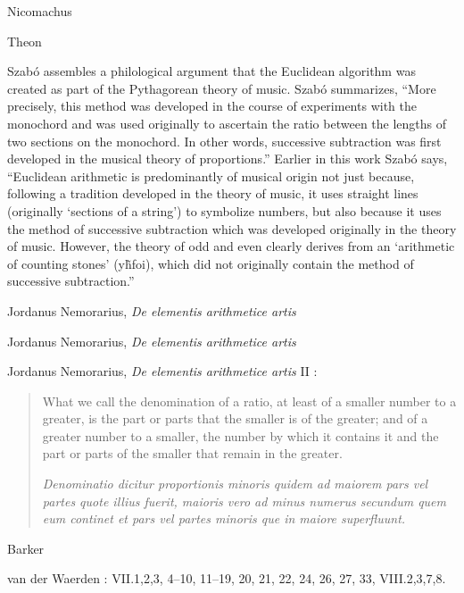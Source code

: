 \documentclass{article}
\begin{document}
Nicomachus \cite{nicomachus}

Theon \cite{theon}

Szab\'o \cite{szabo} assembles a philological argument that the Euclidean algorithm was created
as part of the Pythagorean theory of music. Szab\'o \cite[p.~136, Chapter 2.8]{szabo} summarizes, ``More precisely, 
this method was developed in the course of experiments with the monochord and was used originally to ascertain the ratio
between the lengths of two sections on the monochord. In other words, successive subtraction was first developed in the musical
theory of proportions.'' Earlier in this work Szab\'o \cite[pp.~28--29]{szabo} says, ``Euclidean arithmetic is predominantly of musical origin
not just because, following a tradition developed in the theory of music, it uses straight lines (originally `sections of a string') to symbolize numbers, but also because
it uses the method of successive subtraction which was developed originally in the theory of music. However, the theory of odd and even clearly derives from
an `arithmetic of counting stones' (\textgreek{y\~hfoi}), which did not originally contain the method of successive subtraction.''



Jordanus Nemorarius, {\em De elementis arithmetice artis} \cite{jordanus}

Jordanus Nemorarius, {\em De elementis arithmetice artis} \cite[]{grant}

\begin{quote}

\end{quote}

Jordanus Nemorarius, {\em De elementis arithmetice artis} II \cite[p.~697]{rommevaux2009}:

\begin{quote}
What we call the denomination of a ratio, at least of a smaller number to a greater, is the
part or parts that the smaller is of the greater; and of a greater number to a smaller, the
number by which it contains it and the part or parts of the smaller that remain in the
greater.

{\em Denominatio dicitur proportionis minoris quidem ad maiorem pars vel partes quote illius fuerit,
maioris vero ad minus numerus secundum quem eum continet et pars vel partes minoris que in maiore
superfluunt.}
\end{quote}

Barker \cite{barker}

van der Waerden \cite[p.~113]{waerden}: VII.1,2,3, 4--10, 11--19, 20, 21, 22, 24, 26, 27, 33, VIII.2,3,7,8.
\end{document}

